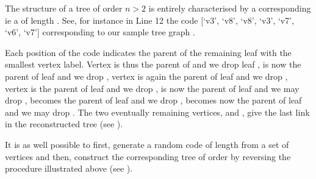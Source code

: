 \documentclass[a4paper,10pt,english]{sphinxhowto}
\begin{document}
The structure of a tree of order \(n > 2\) is entirely characterised by a corresponding   \sphinxhyphen{}ie a \sphinxhyphen{} of length . See, for instance in Line 12 the code {[}‘v3’, ‘v8’, ‘v8’, ‘v3’, ‘v7’, ‘v6’, ‘v7’{]} corresponding to our sample tree graph .

Each position of the code indicates the parent of the remaining leaf with the smallest vertex label. Vertex  is thus the parent of  and we drop leaf ,  is now the parent of leaf  and we drop , vertex  is again the parent of leaf  and we drop , vertex  is the parent of leaf  and we drop ,  is now the parent of leaf  and we may drop ,  becomes the parent of leaf  and we drop ,  becomes now the parent of leaf  and we may drop . The two eventually remaining vertices,  and , give the last link in the reconstructed tree (see ).

It is as well possible to first, generate a random  code of length  from a set of  vertices and then, construct the corresponding tree of order  by reversing the procedure illustrated above (see ).
\end{document}
